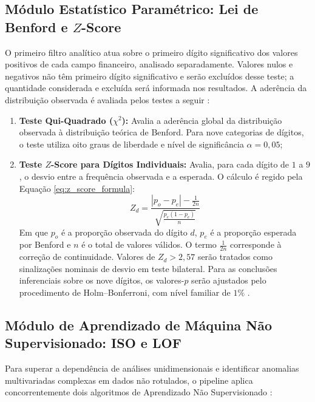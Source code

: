 \documentclass[
    12pt,               %
    openright,          %
    oneside,            %
    a4paper,            %
    chapter=TITLE,      %
    sumario=tradicional,%
    english,            %
    brazilian,          %
 ]{abntex2}
\begin{document}
\subsection{Módulo Estatístico Paramétrico: Lei de Benford e $Z$-Score}\label{subsec:modulo_benford}

O primeiro filtro analítico atua sobre o primeiro dígito significativo dos valores positivos de cada campo financeiro, analisado separadamente. Valores nulos e negativos não têm primeiro dígito significativo e serão excluídos desse teste; a quantidade considerada e excluída será informada nos resultados. A aderência da distribuição observada é avaliada pelos testes a seguir \cite{nigrini2012, cavalcanti2014}:

\begin{enumerate}
    \item \textbf{Teste Qui-Quadrado ($\chi^2$):} Avalia a aderência global da distribuição observada à distribuição teórica de Benford. Para nove categorias de dígitos, o teste utiliza oito graus de liberdade e nível de significância $\alpha = 0,05$;
    \item \textbf{Teste $Z$-Score para Dígitos Individuais:} Avalia, para cada dígito de $1$ a $9$, o desvio entre a frequência observada e a esperada. O cálculo é regido pela Equação \ref{eq:z_score_formula}:
    \begin{equation}\label{eq:z_score_formula}
    Z_d = \frac{|p_o - p_e| - \frac{1}{2n}}{\sqrt{\frac{p_e (1 - p_e)}{n}}}
    \end{equation}
    Em que $p_o$ é a proporção observada do dígito $d$, $p_e$ é a proporção esperada por Benford e $n$ é o total de valores válidos. O termo $\frac{1}{2n}$ corresponde à correção de continuidade. Valores de $Z_d > 2,57$ serão tratados como sinalizações nominais de desvio em teste bilateral. Para as conclusões inferenciais sobre os nove dígitos, os valores-$p$ serão ajustados pelo procedimento de Holm--Bonferroni, com nível familiar de $1\%$ \cite{nigrini2012}.
\end{enumerate}

\subsection{Módulo de Aprendizado de Máquina Não Supervisionado: ISO e LOF}\label{subsec:modulo_ml}

Para superar a dependência de análises unidimensionais e identificar anomalias multivariadas complexas em dados não rotulados, o pipeline aplica concorrentemente dois algoritmos de Aprendizado Não Supervisionado \cite{nunes2021}:
\end{document}
